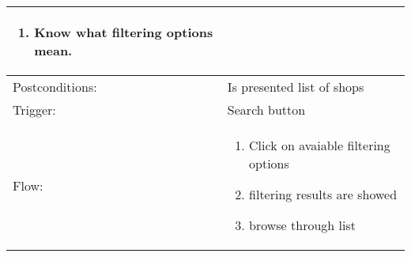 \begin{longtable}{| p{3.5cm} | p{9cm} |}
\begin{enumerate}
\item Know what filtering options mean.
\end{enumerate}\\
\hline
Postconditions: & Is presented list of shops\\
\hline
Trigger: & Search button\\
\hline
Flow: &\mbox{}\par\vspace{-\baselineskip}
\begin{enumerate}
\item Click on avaiable filtering options
\item filtering results are showed 
\item browse through list
\end{enumerate}\\
\hline
\end{longtable}

